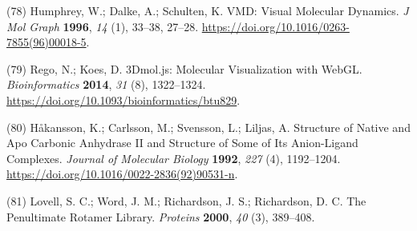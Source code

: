 \documentclass[ lineno,
  9pt]{elife}
\newenvironment{cslreferences}%
  {}%
  {\par}
\begin{document}
\begin{cslreferences}
\leavevmode\hypertarget{ref-PEXAwV3k}{}%
(78) Humphrey, W.; Dalke, A.; Schulten, K. VMD: Visual Molecular Dynamics. \emph{J Mol Graph} \textbf{1996}, \emph{14} (1), 33--38, 27--28. \url{https://doi.org/10.1016/0263-7855(96)00018-5}.

\leavevmode\hypertarget{ref-BguJBlg6}{}%
(79) Rego, N.; Koes, D. 3Dmol.js: Molecular Visualization with WebGL. \emph{Bioinformatics} \textbf{2014}, \emph{31} (8), 1322--1324. \url{https://doi.org/10.1093/bioinformatics/btu829}.

\leavevmode\hypertarget{ref-WjHESl20}{}%
(80) Håkansson, K.; Carlsson, M.; Svensson, L.; Liljas, A. Structure of Native and Apo Carbonic Anhydrase II and Structure of Some of Its Anion-Ligand Complexes. \emph{Journal of Molecular Biology} \textbf{1992}, \emph{227} (4), 1192--1204. \url{https://doi.org/10.1016/0022-2836(92)90531-n}.

\leavevmode\hypertarget{ref-Mg40Hdad}{}%
(81) Lovell, S. C.; Word, J. M.; Richardson, J. S.; Richardson, D. C. The Penultimate Rotamer Library. \emph{Proteins} \textbf{2000}, \emph{40} (3), 389--408.
\end{cslreferences}
\end{document}
